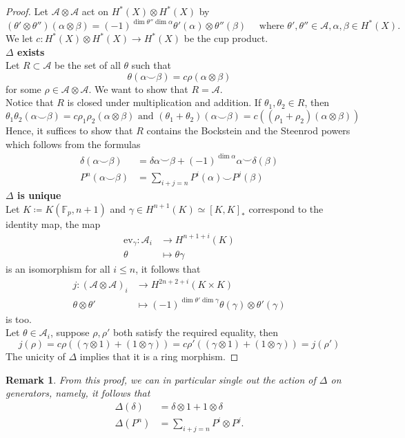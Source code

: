 \documentclass[11pt, a4paper]{article}
\newcommand{\ev}{\mathrm{ev}}
\newtheorem{rmk}[thm]{Remark}
\theoremstyle{plain}
\newtheorem*{proof}{Proof}
\begin{document}
\begin{proof}
Let $\mathcal{A}\otimes \mathcal{A}$ act on $H^{\ast}( X) \otimes H^{\ast}( X) $ by
\[ 
( \theta'\otimes\theta'' )( \alpha\otimes \beta) = ( -1)^{\dim \theta''\dim \alpha}\theta'( \alpha) \otimes \theta''( \beta) \quad \text{ where } \theta', \theta'' \in \mathcal{A}, \alpha,\beta \in H^{\ast}( X).
\]
We let $c\colon H^{\ast}( X) \otimes H^{\ast}( X) \to H^{\ast}( X) $ be the cup product.\\
\textbf{$\Delta$ exists}\\
Let $R \subset \mathcal{A}$ be the set of all $\theta$ such that 
\[ 
\theta( \alpha\smile \beta) = c \rho ( \alpha\otimes \beta) 
\]
for some $\rho \in \mathcal{A}\otimes \mathcal{A}$. We want to show that $R = \mathcal{A}$.\\
Notice that $R$ is closed under multiplication and addition. If $\theta_1, \theta_2\in R$, then 
\[ 
	\theta_1\theta_2( \alpha\smile \beta) = c\rho_1\rho_2( \alpha\otimes \beta) \text{ and } 	( \theta_1 + \theta_2) ( \alpha\smile\beta) = c (  ( \rho_1 + \rho_2 )( \alpha \otimes \beta ) )
\]
Hence, it suffices to show that $R$ contains the Bockstein and the Steenrod powers which follows from the formulas
\begin{align*}
	\delta( \alpha\smile \beta) &= \delta \alpha\smile \beta + ( -1)^{\dim \alpha}\alpha \smile \delta( \beta) \\
	P^{n}( \alpha\smile \beta) &= \sum_{i+j =n}  P^{i}( \alpha) \smile P^{j}( \beta) 
\end{align*}
\textbf{$\Delta$ is unique}\\
Let $K \coloneq K( \mathbb{F}_p, n+1) $ and $\gamma \in H^{n+1}( K) \simeq [ K, K]_\ast$ correspond to the identity map, the map
\begin{align*}
	\ev_{\gamma} \colon \mathcal{A}_i &\to H^{n+1+i}( K) \\
	\theta &\mapsto \theta\gamma
\end{align*}
is an isomorphism for all $i \leq n$, it follows that
\begin{align*}
	j\colon \left( \mathcal{A}\otimes \mathcal{A} \right)_i &\to H^{2n+2+i}( K\times K) \\
	\theta\otimes \theta'&\mapsto ( -1)^{\dim\theta'\dim\gamma} \theta( \gamma) \otimes \theta'( \gamma) 
\end{align*}
is too.\\
Let $\theta\in \mathcal{A}_i$, suppose $\rho, \rho'$ both satisfy the required equality, then
\[ 
j( \rho) =c\rho\left( ( \gamma\otimes 1) + ( 1\otimes \gamma) \right) = c\rho'\left( ( \gamma\otimes 1)+ ( 1\otimes \gamma)  \right) =j(\rho' ) 
\]
The unicity of $\Delta$ implies that it is a ring morphism.
\end{proof}
\begin{rmk}\label{rmk_psi_dual}
From this proof, we can in particular single out the action of $\Delta$ on generators, namely, it follows that 
\begin{align*}
	\Delta( \delta) &= \delta\otimes 1 + 1 \otimes \delta\\
	\Delta( P^{n}) &= \sum_{i+j=n} P^{i}\otimes P^{j}.
\end{align*}
\end{rmk}
\end{document}
